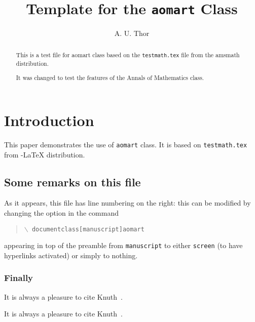 \documentclass{aomart}
\title[Template]{Template for the \texttt{aomart}
  Class}
\author[A.T.]{A. U. Thor}
\begin{document}
\begin{abstract}
  This is a test file for \textsf{aomart} class based on the
  \texttt{testmath.tex} file from the \textsf{amsmath} distribution.

  It was changed to test the features of the Annals of Mathematics
  class.
\end{abstract}

\maketitle
\tableofcontents

\section{Introduction}


This paper demonstrates the use of \texttt{aomart} class.  It is based
on \texttt{testmath.tex} from  \AmS-\LaTeX{} distribution.  \subsection{Some remarks on this file}
As it appears, this file has line numbering on the right: this can be modified by changing the option in the command
\begin{quote}
\texttt{\(\backslash\) documentclass[manuscript]{aomart}}
\end{quote}
appearing in top of the preamble from \texttt{manuscript} to either \texttt{screen} (to have hyperlinks activated) or simply to nothing.

\subsubsection{Finally}
It is always a pleasure to cite Knuth~\cite{Knuth94:TheTeXbook}.

It is always a pleasure to cite Knuth~\cite{Knuth94:TheTeXbook}.




\end{document}

